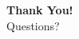 \documentclass{beamer}
\begin{document}
\begin{frame}
\begin{center}
\Huge \textbf{Thank You!}\\
\vspace{1cm}
\Large Questions?
\end{center}
\end{frame}
\end{document}
